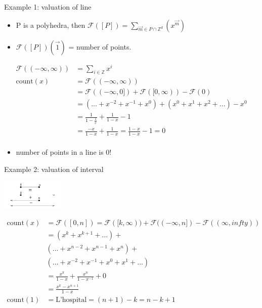 \documentclass[8pt]{beamer}
\begin{document}
\begin{frame}[label=sec-3]{Example 1: valuation of line}
\begin{itemize}
\item P is a polyhedra, then $\mathcal{F}([P]) = \sum_{\vec{m} \in P \cap \mathbb{Z}^d} (x^{\vec{m}} )$
\item $\mathcal{F}([P])(\vec 1)$ = number of points.
\end{itemize}
\begin{align*}
\mathcal{F}((-\infty, \infty)) &= \sum_{i \in \mathbb{Z}} x^i \\
\text{count}(x) &= \mathcal{F}((-\infty, \infty)) \\
                &= \mathcal{F}((-\infty, 0]) + \mathcal{F}([0, \infty))  - \mathcal{F}(0) \\ 
                &=( \ldots + x^{-2} + x^{-1} + x^0) + (x^0 + x^1 + x^2 + \ldots) - x^0 \\
                &= \frac{1}{1 - \frac{1}{x}} + \frac{1}{1 - x} - 1 \\ 
                &= \frac{-x}{1 - x} + \frac{1}{1 - x}  = \frac{1 - x}{1 - x} - 1 = 0 \\
\end{align*}

\begin{itemize}
\item number of points in a line is 0!
\end{itemize}
\end{frame}
\begin{frame}[label=sec-4]{Example 2: valuation of interval}
\begin{center}
 \includegraphics[width=3cm, keepaspectratio]{res/interval}
\end{center}

\begin{align*}
\text{count}(x) &= \mathcal{F}([0, n]) = \mathcal{F}([k, \infty)) + \mathcal{F}((-\infty, n]) - \mathcal{F}((\infty, infty)) \\
                &= (x^k + x^{k + 1} + \ldots) + \\
                & (\ldots +  x^{n - 2} + x^{n - 1} + x^n) +  \\
                & (\ldots + x^{-2} + x^{-1} + x^0 + x^1 + \ldots) \\
                &= \frac{x^k}{1 - x} + \frac{x^n}{1 - x^{-1}} + 0 \\
                &= \frac{x^k - x^{n + 1}}{1 - x} \\
\text{count}(1) &= \text{L'hospital} = (n + 1) - k = n - k + 1
\end{align*}
\end{frame}
\end{document}

